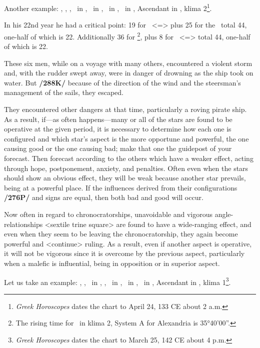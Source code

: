 Another example: \Sun, \Mercury, \Venus, \Moon\, in \Taurus, \Saturn\, in \Sagittarius, \Jupiter\, in \Scorpio, \Mars\, in \Leo, Ascendant in \Pisces, klima 2\footnote{\textit{Greek Horoscopes} dates the chart to  April 24, 133 CE about 2 a.m.}.

In his 22nd year he had a critical point: 19 for \Leo\, <=\Sun> plus 25 for the \Moon\, total 44, one-half of which is 22. Additionally 36 for \Scorpio\footnote{The rising time for \Scorpio\, in klima 2, System A for Alexandria is 35°40'00''.}, plus 8 for \Taurus\, <=\Venus> total 44, one-half of which is 22.

These six men, while on a voyage with many others, encountered a violent storm and, with the rudder swept away, were in danger of drowning as the ship took on water. But \textbf{/288K/} because of the direction of the wind and the steersman’s management of the sails, they escaped. 

They encountered other dangers at that time, particularly a roving pirate ship. \mndl As a result, if—as often happens—many or all of the stars are found to be operative at the given period,
it is necessary to determine how each one is configured and which star’s aspect is the more opportune and powerful, the one causing good or the one causing bad; make that one the guidepost of your forecast. Then forecast according to the others which have a weaker effect, acting through hope, postponement, anxiety, and penalties.  Often even when the stars should show an obvious effect, they will be weak because another star prevails, being at a powerful place. If the influences derived from their configurations \textbf{/276P/} and signs are equal, then both bad and good will occur. 

Now often in regard to chronocratorships, unavoidable and vigorous angle-relationships <sextile trine square> are found to have a wide-ranging effect, and even when they seem to be leaving the chronocratorship, they again become powerful and <continue> ruling. As a result, even if another aspect is operative, it will not be vigorous since it is overcome by the previous aspect, particularly when a malefic is influential, being in opposition or in superior aspect.

Let us take an example: \Sun, \Saturn, \Mercury\, in \Aries, \Moon, \Jupiter\, in \Leo, \Mars\, in \Taurus, \Venus\, in \Aquarius, Ascendant in \Virgo, klima 1\footnote{\textit{Greek Horoscopes} dates the chart to March 25, 142 CE about 4 p.m.}.

